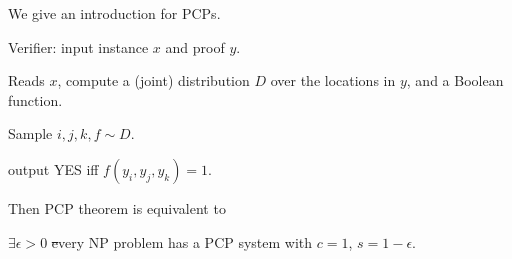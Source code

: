 We give an introduction for PCPs.

\begin{definition}
    Verifier: input instance  $ x $ and proof  $ y $.
    
    Reads  $ x $, compute a (joint) distribution $ D $  over the locations in  $ y $, and a Boolean function.
    
    Sample  $ i,j,k,f \sim D $.

    output YES iff  $ f(y_i,y_j,y_k)=1 $.

\end{definition}

Then PCP theorem is equivalent to 
\begin{theorem}
    $ \exists \epsilon>0 $ \st every NP problem has a PCP system with  $ c=1 $,  $ s=1-\epsilon $.   
\end{theorem}